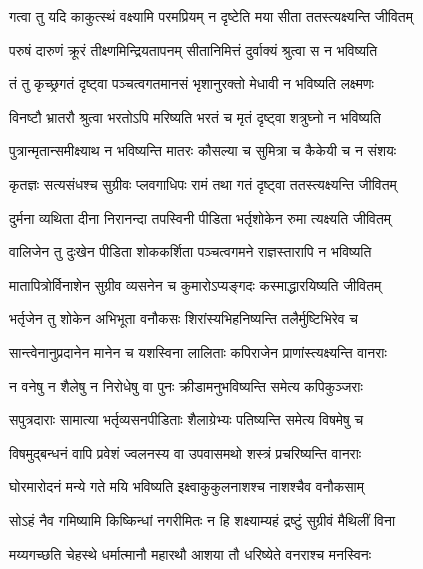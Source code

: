 \twolineshloka
{गत्वा तु यदि काकुत्स्थं वक्ष्यामि परमप्रियम्}
{न दृष्टेति मया सीता ततस्त्यक्ष्यन्ति जीवितम्} %

\twolineshloka
{परुषं दारुणं क्रूरं तीक्ष्णमिन्द्रियतापनम्}
{सीतानिमित्तं दुर्वाक्यं श्रुत्वा स न भविष्यति} %

\twolineshloka
{तं तु कृच्छ्रगतं दृष्ट्वा पञ्चत्वगतमानसं}
{भृशानुरक्तो मेधावी न भविष्यति लक्ष्मणः} %

\twolineshloka
{विनष्टौ भ्रातरौ श्रुत्वा भरतोऽपि मरिष्यति}
{भरतं च मृतं दृष्ट्वा शत्रुघ्नो न भविष्यति} %

\twolineshloka
{पुत्रान्मृतान्समीक्ष्याथ न भविष्यन्ति मातरः}
{कौसल्या च सुमित्रा च कैकेयी च न संशयः} %

\twolineshloka
{कृतज्ञः सत्यसंधश्च सुग्रीवः प्लवगाधिपः}
{रामं तथा गतं दृष्ट्वा ततस्त्यक्ष्यन्ति जीवितम्} %

\twolineshloka
{दुर्मना व्यथिता दीना निरानन्दा तपस्विनी}
{पीडिता भर्तृशोकेन रुमा त्यक्ष्यति जीवितम्} %

\twolineshloka
{वालिजेन तु दुःखेन पीडिता शोककर्शिता}
{पञ्चत्वगमने राज्ञस्तारापि न भविष्यति} %

\twolineshloka
{मातापित्रोर्विनाशेन सुग्रीव व्यसनेन च}
{कुमारोऽप्यङ्गदः कस्माद्धारयिष्यति जीवितम्} %

\twolineshloka
{भर्तृजेन तु शोकेन अभिभूता वनौकसः}
{शिरांस्यभिहनिष्यन्ति तलैर्मुष्टिभिरेव च} %

\twolineshloka
{सान्त्वेनानुप्रदानेन मानेन च यशस्विना}
{लालिताः कपिराजेन प्राणांस्त्यक्ष्यन्ति वानराः} %

\twolineshloka
{न वनेषु न शैलेषु न निरोधेषु वा पुनः}
{क्रीडामनुभविष्यन्ति समेत्य कपिकुञ्जराः} %

\twolineshloka
{सपुत्रदाराः सामात्या भर्तृव्यसनपीडिताः}
{शैलाग्रेभ्यः पतिष्यन्ति समेत्य विषमेषु च} %

\twolineshloka
{विषमुद्बन्धनं वापि प्रवेशं ज्वलनस्य वा}
{उपवासमथो शस्त्रं प्रचरिष्यन्ति वानराः} %

\twolineshloka
{घोरमारोदनं मन्ये गते मयि भविष्यति}
{इक्ष्वाकुकुलनाशश्च नाशश्चैव वनौकसाम्} %

\twolineshloka
{सोऽहं नैव गमिष्यामि किष्किन्धां नगरीमितः}
{न हि शक्ष्याम्यहं द्रष्टुं सुग्रीवं मैथिलीं विना} %

\twolineshloka
{मय्यगच्छति चेहस्थे धर्मात्मानौ महारथौ}
{आशया तौ धरिष्येते वनराश्च मनस्विनः} %


